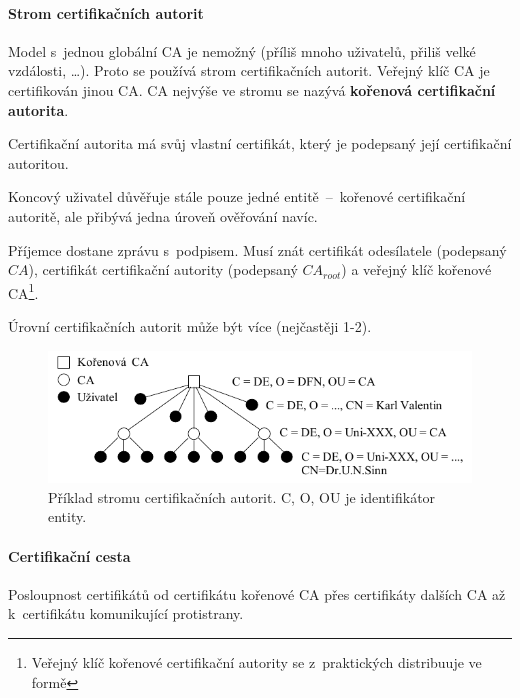 \paragraph*{Strom certifikačních autorit} Model s~jednou globální CA je nemožný (příliš mnoho uživatelů, přiliš velké vzdálosti, \dots). Proto se používá strom certifikačních autorit. Veřejný klíč CA je certifikován jinou CA. CA nejvýše ve stromu se nazývá \textbf{kořenová certifikační autorita}. \begin{compactitem}
    \item Certifikační autorita má svůj vlastní certifikát, který je podepsaný její certifikační autoritou.
    \item Koncový uživatel důvěřuje stále pouze jedné entitě~--~kořenové certifikační autoritě, ale přibývá jedna úroveň ověřování navíc.
    \item Příjemce dostane zprávu s~podpisem. Musí znát certifikát odesílatele (podepsaný $CA$), certifikát certifikační autority (podepsaný $CA_{root}$) a veřejný klíč kořenové CA\footnote{Veřejný klíč kořenové certifikační autority se z~praktických distribuuje ve formě }.
    \item Úrovní certifikačních autorit může být více (nejčastěji 1-2).
\end{compactitem}

\begin{figure}[H]
    \centering
    \includegraphics[width=1\linewidth]{certifikacni_strom.pdf}
    \caption{Příklad stromu certifikačních autorit. C, O, OU je identifikátor entity.}
\end{figure}

\paragraph*{Certifikační cesta} Posloupnost certifikátů od certifikátu kořenové CA přes certifikáty dalších CA až k~certifikátu komunikující protistrany.

